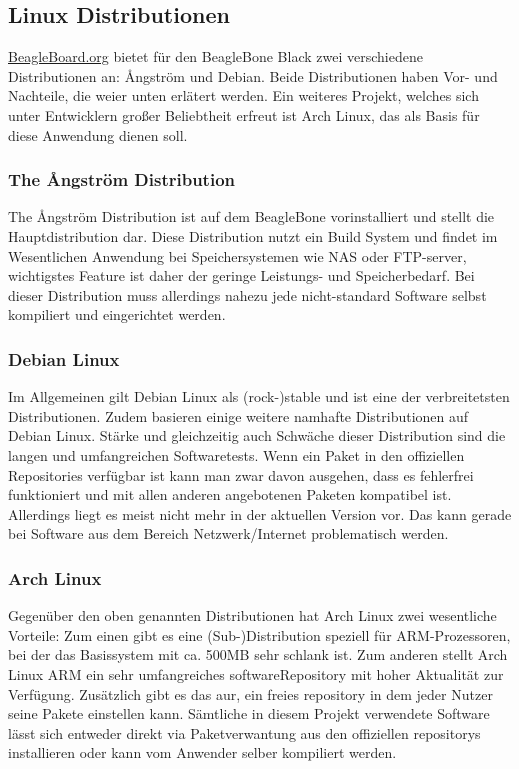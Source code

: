 \subsection{Linux Distributionen}
\href{http://beagleboard.org/}{BeagleBoard.org} bietet für den BeagleBone Black zwei verschiedene Distributionen an: {\AA}ngström und Debian. Beide Distributionen haben Vor- und Nachteile, die weier unten erlätert werden. Ein weiteres Projekt, welches sich unter Entwicklern großer Beliebtheit erfreut ist Arch Linux, das als Basis für diese Anwendung dienen soll.

\subsubsection{The {\AA}ngström Distribution}
The {\AA}ngström Distribution ist auf dem BeagleBone vorinstalliert und stellt die Hauptdistribution dar. Diese Distribution nutzt ein Build System und findet im Wesentlichen Anwendung bei Speichersystemen wie NAS oder FTP-server, wichtigstes Feature ist daher der geringe Leistungs- und Speicherbedarf. Bei dieser Distribution muss allerdings nahezu jede nicht-standard Software selbst kompiliert und eingerichtet werden.

\subsubsection{Debian Linux}
Im Allgemeinen gilt Debian Linux als (rock-)stable und ist eine der verbreitetsten Distributionen. Zudem basieren einige weitere namhafte Distributionen auf Debian Linux. Stärke und gleichzeitig auch Schwäche dieser Distribution sind die langen und umfangreichen Softwaretests. Wenn ein Paket in den offiziellen Repositories verfügbar ist kann man zwar davon ausgehen, dass es fehlerfrei funktioniert und mit allen anderen angebotenen Paketen kompatibel ist. Allerdings liegt es meist nicht mehr in der aktuellen Version vor. Das kann gerade bei Software aus dem Bereich Netzwerk/Internet problematisch werden.

\subsubsection{Arch Linux}
Gegenüber den oben genannten Distributionen hat Arch Linux zwei wesentliche Vorteile: Zum einen gibt es eine (Sub-)Distribution speziell für ARM-Prozessoren, bei der das Basissystem mit ca. 500MB sehr schlank ist. Zum anderen stellt Arch Linux ARM ein sehr umfangreiches \gls{softwareRepository} mit hoher Aktualität zur Verfügung. Zusätzlich gibt es das \gls{aur}, ein freies \gls{repository} in dem jeder Nutzer seine Pakete einstellen kann. Sämtliche in diesem Projekt verwendete Software lässt sich entweder direkt via Paketverwantung aus den offiziellen \glspl{repository} installieren oder kann vom Anwender selber kompiliert werden.

